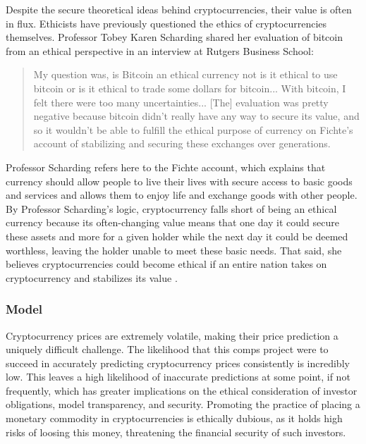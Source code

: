 \documentclass[10pt,twocolumn]{article}
\begin{document}
Despite the secure theoretical ideas behind cryptocurrencies, their value is often in flux. Ethicists have previously questioned the ethics of cryptocurrencies themselves. Professor Tobey Karen Scharding shared her evaluation of bitcoin from an ethical perspective in an interview at Rutgers Business School:

\begin{quote}
    My question was, is Bitcoin an ethical currency not is it ethical to use bitcoin or is it ethical to trade some dollars for bitcoin... With bitcoin, I felt there were too many uncertainties... [The] evaluation was pretty negative because bitcoin didn't really have any way to secure its value, and so it wouldn't be able to fulfill the ethical purpose of currency on Fichte's account of stabilizing and securing these exchanges over generations. \cite{IsBitcoinEthical}
\end{quote}

Professor Scharding refers here to the Fichte account, which explains that currency should allow people to live their lives with secure access to basic goods and services and allows them to enjoy life and exchange goods with other people. By Professor Scharding's logic, cryptocurrency falls short of being an ethical currency because its often-changing value means that one day it could secure these assets and more for a given holder while the next day it could be deemed worthless, leaving the holder unable to meet these basic needs. That said, she believes cryptocurrencies could become ethical if an entire nation takes on cryptocurrency and stabilizes its value \cite{IsBitcoinEthical}.

\subsubsection{Model}

Cryptocurrency prices are extremely volatile, making their price prediction a uniquely difficult challenge. The likelihood that this comps project were to succeed in accurately predicting cryptocurrency prices consistently is incredibly low. This leaves a high likelihood  of inaccurate predictions at some point, if not frequently, which has greater implications on the ethical consideration of investor obligations, model transparency, and security. Promoting the practice of placing a monetary commodity in cryptocurrencies is ethically dubious, as it holds high risks of loosing this money, threatening the financial security of such investors.
\end{document}
